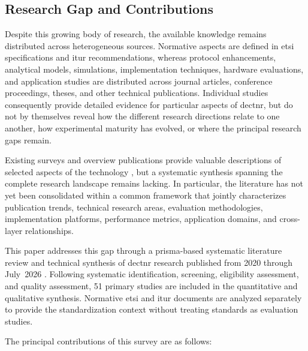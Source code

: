 \subsection{Research Gap and Contributions}
\label{subsec:intro_gap}

Despite this growing body of research, the available knowledge remains distributed across heterogeneous sources. Normative aspects are defined in \gls{etsi} specifications and \gls{itur} recommendations, whereas protocol enhancements, analytical models, simulations, implementation techniques, hardware evaluations, and application studies are distributed across journal articles, conference proceedings, theses, and other technical publications. Individual studies consequently provide detailed evidence for particular aspects of \gls{dectnr}, but do not by themselves reveal how the different research directions relate to one another, how experimental maturity has evolved, or where the principal research gaps remain.

Existing surveys and overview publications provide valuable descriptions of selected aspects of the technology \cite{kovalchukovDECT2020NewRadio2022, perez-guiraoDECTNRUnveiling2022, smidaETSIDECT2020Component2023}, but a systematic synthesis spanning the complete research landscape remains lacking. In particular, the literature has not yet been consolidated within a common framework that jointly characterizes publication trends, technical research areas, evaluation methodologies, implementation platforms, performance metrics, application domains, and cross-layer relationships.

This paper addresses this gap through a \gls{prisma}-based systematic literature review and technical synthesis of \gls{dectnr} research published from 2020 through July~2026 \cite{pagePRISMA2020}. Following systematic identification, screening, eligibility assessment, and quality assessment, 51 primary studies are included in the quantitative and qualitative synthesis. Normative \gls{etsi} and \gls{itur} documents are analyzed separately to provide the standardization context without treating standards as evaluation studies.

The principal contributions of this survey are as follows:

